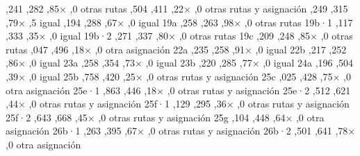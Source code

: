 	\bTR {} \eTD {},241 \eTD {},282 \eTD {},85× \eTD {},0 \eTD \bTD otras rutas \eTD \eTR
	\bTR {} \eTD {},504 \eTD {},411 \eTD {},22× \eTD {},0 \eTD \bTD otras rutas y asignación \eTD \eTR
	\bTR {} \eTD {},249 \eTD {},315 \eTD {},79× \eTD {},5 \eTD \bTD igual \eTD \eTR
	\bTR {} \eTD {},194 \eTD {},288 \eTD {},67× \eTD {},0 \eTD \bTD igual \eTD \eTR
	\bTR \bTD 19a \eTD {},258 \eTD {},263 \eTD {},98× \eTD {},0 \eTD \bTD otras rutas \eTD \eTR
	\bTR \bTD 19b·1 \eTD {},117 \eTD {},333 \eTD {},35× \eTD {},0 \eTD \bTD igual \eTD \eTR
	\bTR \bTD 19b·2 \eTD {},271 \eTD {},337 \eTD {},80× \eTD {},0 \eTD \bTD otras rutas \eTD \eTR
	\bTR \bTD 19c \eTD {},209 \eTD {},248 \eTD {},85× \eTD {},0 \eTD \bTD otras rutas \eTD \eTR
	\bTR {} \eTD {},047 \eTD {},496 \eTD {},18× \eTD {},0 \eTD \bTD otra asignación \eTD \eTR
	\bTR \bTD 22a \eTD {},235 \eTD {},258 \eTD {},91× \eTD {},0 \eTD \bTD igual \eTD \eTR
	\bTR \bTD 22b \eTD {},217 \eTD {},252 \eTD {},86× \eTD {},0 \eTD \bTD igual \eTD \eTR
	\bTR \bTD 23a \eTD {},258 \eTD {},354 \eTD {},73× \eTD {},0 \eTD \bTD igual \eTD \eTR
	\bTR \bTD 23b \eTD {},220 \eTD {},285 \eTD {},77× \eTD {},0 \eTD \bTD igual \eTD \eTR
	\bTR \bTD 24a \eTD {},196 \eTD {},504 \eTD {},39× \eTD {},0 \eTD \bTD igual \eTD \eTR
	\bTR \bTD 25b \eTD {},758 \eTD {},420 \eTD {},25× \eTD {},0 \eTD \bTD otras rutas y asignación \eTD \eTR
	\bTR \bTD 25c \eTD {},025 \eTD {},428 \eTD {},75× \eTD {},0 \eTD \bTD otra asignación \eTD \eTR
	\bTR \bTD 25e·1 \eTD {},863 \eTD {},446 \eTD {},18× \eTD {},0 \eTD \bTD otras rutas y asignación \eTD \eTR
	\bTR \bTD 25e·2 \eTD {},512 \eTD {},621 \eTD {},44× \eTD {},0 \eTD \bTD otras rutas y asignación \eTD \eTR
	\bTR \bTD 25f·1 \eTD {},129 \eTD {},295 \eTD {},36× \eTD {},0 \eTD \bTD otras rutas y asignación \eTD \eTR
	\bTR \bTD 25f·2 \eTD {},643 \eTD {},668 \eTD {},45× \eTD {},0 \eTD \bTD otras rutas y asignación \eTD \eTR
	\bTR \bTD 25g \eTD {},104 \eTD {},448 \eTD {},64× \eTD {},0 \eTD \bTD otra asignación \eTD \eTR
	\bTR \bTD 26b·1 \eTD {},263 \eTD {},395 \eTD {},67× \eTD {},0 \eTD \bTD otras rutas y asignación \eTD \eTR
	\bTR \bTD 26b·2 \eTD {},501 \eTD {},641 \eTD {},78× \eTD {},0 \eTD \bTD otra asignación \eTD \eTR
